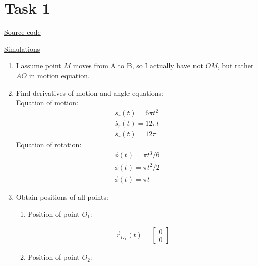 \section{Task 1}

\href{https://github.com/lvjonok/f22-theoretical-mechanics/blob/master/homework3/task1.ipynb}{Source code}

\href{https://lvjonok.github.io/f22-theoretical-mechanics/2022/09/18/homework3.html}{Simulations}

\begin{enumerate}
    \item I assume point $M$ moves from A to B,
          so I actually have not $OM$, but rather $AO$ in motion equation.
    \item Find derivatives of motion and angle equations: \\
          Equation of motion:
          \begin{align}
              s_r(t) = 6 \pi t^2      \\
              \dot{s_r}(t) = 12 \pi t \\
              \ddot{s_r}(t) = 12 \pi
          \end{align}
          Equation of rotation:
          \begin{align}
              \phi(t) = \pi t^3/6       \\
              \dot{\phi}(t) = \pi t^2/2 \\
              \ddot{\phi}(t) = \pi t
          \end{align}
    \item Obtain positions of all points:
          \begin{enumerate}
              \item Position of point $O_1$:
                    \begin{answer}
                        \begin{align}
                            \vec{r}_{O_1}(t) = \begin{bmatrix}
                                0 \\
                                0
                            \end{bmatrix}
                        \end{align}
                    \end{answer}
              \item Position of point $O_2$:
                    \begin{answer}
                        \begin{align}

\end{align}
\end{answer}
\end{enumerate}
\end{enumerate}
